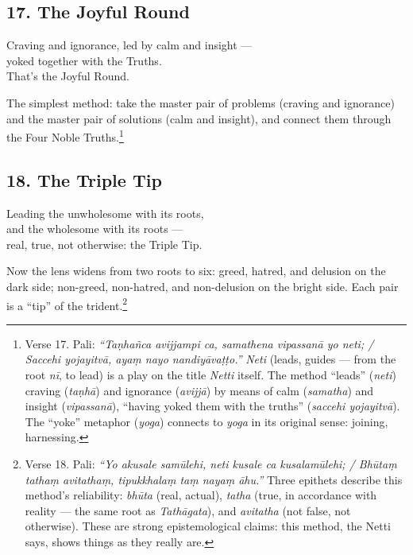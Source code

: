 \subsection*{17. The Joyful Round}

\begin{versebox}
Craving and ignorance, led by calm and insight ---\\
yoked together with the Truths.\\
That's the Joyful Round.
\end{versebox}

The simplest method: take the master pair of problems (craving and ignorance) and the master pair of solutions (calm and insight), and connect them through the Four Noble Truths.\footnote{Verse 17. Pali: \textit{``Taṇhañca avijjampi ca, samathena vipassanā yo neti; / Saccehi yojayitvā, ayaṃ nayo nandiyāvaṭṭo.''} \textit{Neti} (leads, guides --- from the root \textit{nī}, to lead) is a play on the title \textit{Netti} itself. The method ``leads'' (\textit{neti}) craving (\textit{taṇhā}) and ignorance (\textit{avijjā}) by means of calm (\textit{samatha}) and insight (\textit{vipassanā}), ``having yoked them with the truths'' (\textit{saccehi yojayitvā}). The ``yoke'' metaphor (\textit{yoga}) connects to \textit{yoga} in its original sense: joining, harnessing.}

\subsection*{18. The Triple Tip}

\begin{versebox}
Leading the unwholesome with its roots,\\
and the wholesome with its roots ---\\
real, true, not otherwise: the Triple Tip.
\end{versebox}

Now the lens widens from two roots to six: greed, hatred, and delusion on the dark side; non-greed, non-hatred, and non-delusion on the bright side. Each pair is a ``tip'' of the trident.\footnote{Verse 18. Pali: \textit{``Yo akusale samūlehi, neti kusale ca kusalamūlehi; / Bhūtaṃ tathaṃ avitathaṃ, tipukkhalaṃ taṃ nayaṃ āhu.''} Three epithets describe this method's reliability: \textit{bhūta} (real, actual), \textit{tatha} (true, in accordance with reality --- the same root as \textit{Tathāgata}), and \textit{avitatha} (not false, not otherwise). These are strong epistemological claims: this method, the Netti says, shows things as they really are.}

